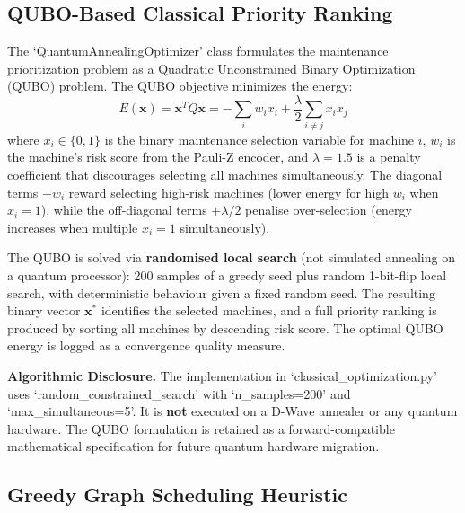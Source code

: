 \subsection{QUBO-Based Classical Priority Ranking}

The `QuantumAnnealingOptimizer' class formulates the maintenance prioritization problem as a Quadratic Unconstrained Binary Optimization (QUBO) problem. The QUBO objective minimizes the energy:
\begin{equation}
E(\mathbf{x}) = \mathbf{x}^T Q \mathbf{x} = -\sum_i w_i x_i + \frac{\lambda}{2} \sum_{i \neq j} x_i x_j
\label{eq:qubo}
\end{equation}
where $x_i \in \{0,1\}$ is the binary maintenance selection variable for machine $i$, $w_i$ is the machine's risk score from the Pauli-Z encoder, and $\lambda = 1.5$ is a penalty coefficient that discourages selecting all machines simultaneously. The diagonal terms $-w_i$ reward selecting high-risk machines (lower energy for high $w_i$ when $x_i = 1$), while the off-diagonal terms $+\lambda/2$ penalise over-selection (energy increases when multiple $x_i = 1$ simultaneously).

The QUBO is solved via \textbf{randomised local search} (not simulated annealing on a quantum processor): 200 samples of a greedy seed plus random 1-bit-flip local search, with deterministic behaviour given a fixed random seed. The resulting binary vector $\mathbf{x}^*$ identifies the selected machines, and a full priority ranking is produced by sorting all machines by descending risk score. The optimal QUBO energy is logged as a convergence quality measure.

\textbf{Algorithmic Disclosure.} The implementation in `classical_optimization.py' uses `random_constrained_search' with `n_samples=200' and `max_simultaneous=5'. It is \textbf{not} executed on a D-Wave annealer or any quantum hardware. The QUBO formulation is retained as a forward-compatible mathematical specification for future quantum hardware migration.

\subsection{Greedy Graph Scheduling Heuristic}

